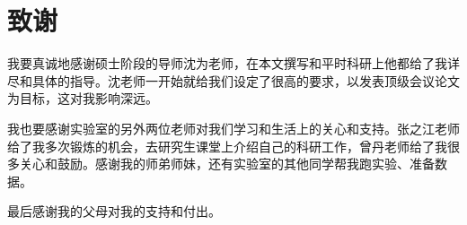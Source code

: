 \documentclass[UTF8]{ctexart}
\numberwithin{equation}{section} %
\numberwithin{table}{section} %
\begin{document}
\pagebreak
\section*{致谢}
我要真诚地感谢硕士阶段的导师沈为老师，在本文撰写和平时科研上他都给了我详尽和具体的指导。沈老师一开始就给我们设定了很高的要求，以发表顶级会议论文为目标，这对我影响深远。

我也要感谢实验室的另外两位老师对我们学习和生活上的关心和支持。张之江老师给了我多次锻炼的机会，去研究生课堂上介绍自己的科研工作，曾丹老师给了我很多关心和鼓励。感谢我的师弟师妹，还有实验室的其他同学帮我跑实验、准备数据。

最后感谢我的父母对我的支持和付出。
\end{document}
